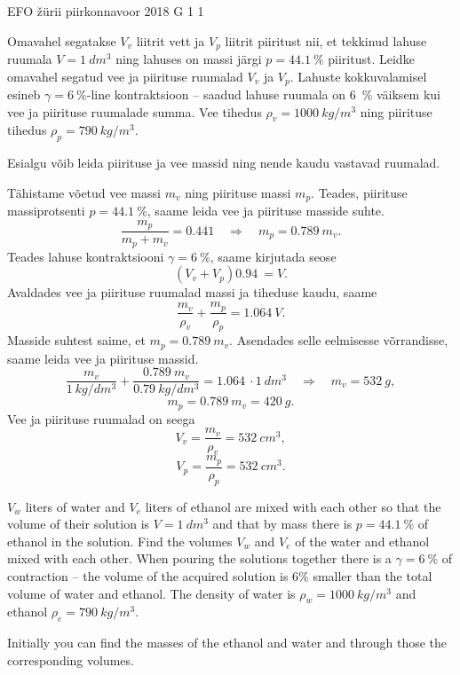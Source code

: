 {EFO žürii} %
{piirkonnavoor} %
{2018} %
{G 1} %
{1} %
{
\ifStatement
Omavahel segatakse $V_v$ liitrit vett ja $V_p$ liitrit piiritust nii, et tekkinud lahuse ruumala $V=\SI{1}{dm^3}$ ning lahuses on massi järgi $p=\SI{44,1}{\percent}$ piiritust. Leidke omavahel segatud vee ja piirituse ruumalad $V_v$ ja $V_p$. Lahuste kokkuvalamisel esineb $\gamma = \SI{6}{\percent}$-line kontraktsioon -- saadud lahuse ruumala on \SI{6}{\percent} väiksem kui vee ja piirituse ruumalade summa. Vee tihedus $\rho_v=\SI{1000}{kg/m^3}$ ning piirituse tihedus $\rho_p=\SI{790}{kg/m^3}$.
\fi


\ifHint
Esialgu võib leida piirituse ja vee massid ning nende kaudu vastavad ruumalad.
\fi


\ifSolution
Tähistame võetud vee massi $m_v$ ning piirituse massi $m_p$. Teades, piirituse massiprotsenti $p = \SI{44,1}{\percent}$, saame leida vee ja piirituse masside suhte.
\[ \frac{m_p}{m_p+m_v}=\SI{0,441} \quad\Rightarrow\quad m_p=\SI{0,789}{}m_v.\]
Teades lahuse kontraktsiooni $\gamma = \SI{6}{\percent}$, saame kirjutada seose
\[ (V_v + V_p)\SI{0,94}{} = V.\]
Avaldades vee ja piirituse ruumalad massi ja tiheduse kaudu, saame
\[ \frac{m_v}{\rho_v} + \frac{m_p}{\rho_p} = \SI{1,064}{}V.\]
Masside suhtest saime, et $m_p=\SI{0,789}{}m_v$. Asendades selle eelmisesse võrrandisse, saame leida vee ja piirituse massid.
\[ \frac{m_v}{\SI{1}{kg/dm^3}} + \frac{\SI{0,789}{}{m_v}}{\SI{0,79}{kg/dm^3}} = \SI{1,064}{}\cdot\SI{1}{dm^3} \quad\Rightarrow\quad
m_v = \SI{532}{g},\]
\[ m_p = \SI{0,789}{}m_v = \SI{420}{g}.\]
Vee ja piirituse ruumalad on seega
\[ V_v = \frac{m_v}{\rho_v} = \SI{532}{cm^3},\]
\[ V_p = \frac{m_p}{\rho_p} = \SI{532}{cm^3}.\]
\fi


\ifEngStatement
$V_w$ liters of water and $V_e$ liters of ethanol are mixed with each other so that the volume of their solution is $V=\SI{1}{dm^3}$ and that by mass there is $p=\SI{44,1}{\percent}$ of ethanol in the solution. Find the volumes $V_w$ and $V_e$ of the water and ethanol mixed with each other. When pouring the solutions together there is a $\gamma = \SI{6}{\percent}$ of contraction – the volume of the acquired solution is 6\% smaller than the total volume of water and ethanol. The density of water is $\rho_w=\SI{1000}{kg/m^3}$ and ethanol $\rho_e=\SI{790}{kg/m^3}$.
\fi


\ifEngHint
Initially you can find the masses of the ethanol and water and through those the corresponding volumes.
\fi


}
